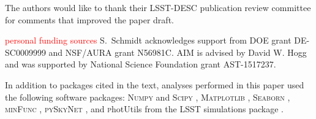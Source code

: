 \documentclass[\docopts]{\docclass}
\newcommand{\red}[1]{\textcolor{red}{#1}}
\begin{document}

The authors would like to thank their LSST-DESC publication review committee for comments that improved the paper draft.

{ \red{personal funding sources}}
S.~Schmidt acknowledges support from DOE grant DE-SC0009999 and NSF/AURA grant N56981C.  AIM is advised by David W. Hogg and was supported by National Science Foundation grant AST-1517237.

In addition to packages cited in the text, analyses performed in this paper used the following software packages: \textsc{Numpy} and \textsc{Scipy} \citep{numpyscipy}, \textsc{Matplotlib} \citep{matplotlib}, \textsc{Seaborn} \citep{seaborn}, \textsc{minFunc} \citep{minfunc}, \textsc{pySkyNet} \citep{pyskynet}, and {\textsc photUtils} from the LSST simulations package \citep{lsstphotutils}.



%
%






\end{document}
